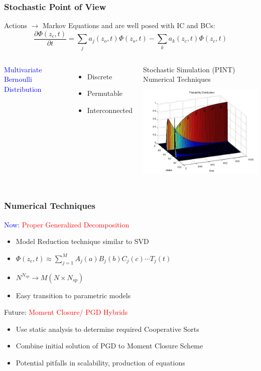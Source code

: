 \begin{frame}
 \frametitle{Stochastic Point of View}
 Actions $\rightarrow$ Markov Equations and are well posed with IC and BCs:
    \[
\frac{\partial \Phi(z_c,t)}{\partial t} = \sum_j  a_j(z_o,t)\Phi(z_o,t) -\sum_k a_k(z_c,t)\Phi(z_c,t)
\]
\begin{columns}
\hfill
 \textcolor{blue}{Multivariate Bernoulli Distribution}
 \begin{itemize}
  \item Discrete
  \item Permutable
  \item Interconnected
 \end{itemize}
 Stochastic Simulation (PINT)\\
 Numerical Techniques
  \includegraphics[trim=0mm 0mm -50mm 0mm, width=70mm,height=50mm]{./figures/MH_probab_plot.jpg}
\hfill
\end{columns}

\end{frame}


\begin{frame}
 \frametitle{Numerical Techniques}
 \textcolor{blue}{Now}: \textcolor{red}{Proper Generalized Decomposition}
 \begin{itemize}
 \item Model Reduction technique similar to SVD
  \item $\Phi(z_c,t) \approx \sum\limits^{M}_{j=1}A_j(a) B_j(b)  C_j(c)\cdots T_j(t)$
  \item $N^{N_{sp}}\rightarrow M\left( N\times N_{sp} \right)$
  \item Easy transition to parametric models
 \end{itemize}
 
 \begin{block}{Future: \textcolor{red}{Moment Closure/ PGD Hybrids}}

\begin{itemize}
 \item Use static analysis to determine required Cooperative Sorts
 \item Combine initial solution of PGD to Moment Closure Scheme
 \item Potential pitfalls in scalability, production of equations
\end{itemize}
\end{block}

\end{frame}
